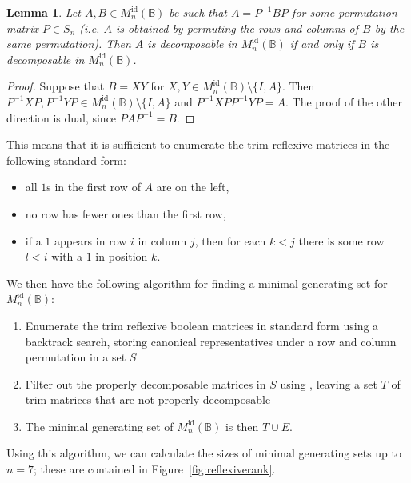 \documentclass[11pt]{article}
\newtheorem{lemma}[thm]{Lemma}
\numberwithin{equation}{section}
\newcommand{\B}{\mathbb{B}}
\newcommand{\Refn}{M_n^{\text{id}}(\B)}
\begin{document}
\begin{lemma}
  Let $A, B \in \Refn$ be such that $A = P^{-1} B P$ for some permutation matrix
  $P \in S_n$ (i.e. $A$ is obtained by permuting the rows and columns of $B$ by
  the same permutation). Then $A$ is decomposable in $\Refn$ if and only if $B$
  is decomposable in $\Refn$.
\end{lemma}
\begin{proof}
  Suppose that $B = XY$ for $X, Y \in \Refn\setminus \{I, A\}$. Then $P^{-1}XP,
  P^{-1}YP \in \Refn\setminus\{I, A\}$ and $P^{-1}XPP^{-1}YP = A$. The proof of
  the other direction is dual, since $PAP^{-1} = B$.
\end{proof}

This means that it is sufficient to enumerate the trim reflexive matrices in the
following standard form:
\begin{itemize}
  \item{all $1$s in the first row of $A$ are on the left,}
  \item{no row has fewer ones than the first row,}
  \item{if a $1$ appears in row $i$ in column $j$, then for each $k < j$ there
      is some row $l < i$ with a $1$ in position $k$.}
\end{itemize}

We then have the following algorithm for finding a minimal generating set for
$\Refn$:
\begin{enumerate}
  \item
    Enumerate the trim reflexive boolean matrices in standard form using a
    backtrack search, storing canonical representatives under a row and column
    permutation in a set $S$
  \item 
    Filter out the properly decomposable matrices in $S$ using
    , leaving a set $T$ of trim matrices that
    are not properly decomposable
  \item
    The minimal generating set of $\Refn$ is then $T \cup E$.
\end{enumerate}
Using this algorithm, we can calculate the sizes of minimal generating sets up
to $n = 7$; these are contained in Figure~\ref{fig:reflexiverank}.
\end{document}
